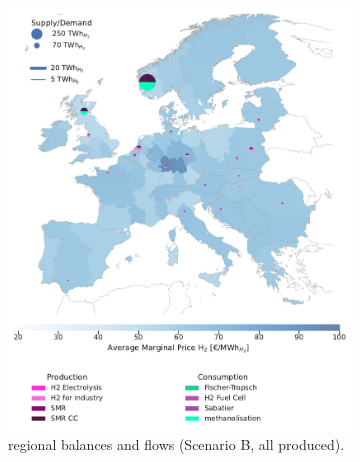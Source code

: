 \documentclass[preprint,12pt]{elsarticle}
\begin{document}
\begin{figure}[!htbp]
  \begin{subfigure}[t]{0.47\textwidth}
      \vspace{0pt}
      \includegraphics[width=\textwidth]{balance_map_h2_scenario_b}
      \vspace{0.3cm}
      \vspace{-0.3cm}
      \caption{ regional balances and flows (Scenario B, all  produced).}
      \label{fig:balance_map_h2_scenario_b}
  \end{subfigure}
  \hfill
  \begin{subfigure}[t]{0.47\textwidth}
      \vspace{0pt}

\end{subfigure}
\end{figure}
\end{document}
